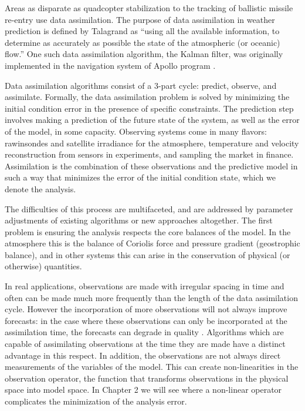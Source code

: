 \documentclass[12pt]{report}
\begin{document}
Areas as disparate as quadcopter stabilization  to the tracking of ballistic missile re-entry  use data assimilation.
The purpose of data assimilation in weather prediction is defined by Talagrand as ``using all the available information, to determine as accurately as possible the state of the atmospheric (or oceanic) flow.'' 
One such data assimilation algorithm, the Kalman filter, was originally implemented in the navigation system of Apollo program .

Data assimilation algorithms consist of a 3-part cycle: predict, observe, and assimilate.
Formally, the data assimilation problem is solved by minimizing the initial condition error in the presence of specific constraints.
The prediction step involves making a prediction of the future state of the system, as well as the error of the model, in some capacity.
Observing systems come in many flavors: rawinsondes and satellite irradiance for the atmosphere, temperature and velocity reconstruction from sensors in experiments, and sampling the market in finance.
Assimilation is the combination of these observations and the predictive model in such a way that minimizes the error of the initial condition state, which we denote the analysis.

The difficulties of this process are multifaceted, and are addressed by parameter adjustments of existing algorithms or new approaches altogether.
The first problem is ensuring the analysis respects the core balances of the model.
In the atmosphere this is the balance of Coriolis force and pressure gradient (geostrophic balance), and in other systems this can arise in the conservation of physical (or otherwise) quantities.

In real applications, observations are made with irregular spacing in time and often can be made much more frequently than the length of the data assimilation cycle.
However the incorporation of more observations will not always improve forecasts: in the case where these observations can only be incorporated at the assimilation time, the forecasts can degrade in quality .
Algorithms which are capable of assimilating observations at the time they are made have a distinct advantage in this respect.
In addition, the observations are not always direct measurements of the variables of the model. 
This can create non-linearities in the observation operator, the function that transforms observations in the physical space into model space.
In Chapter 2 we will see where a non-linear operator complicates the minimization of the analysis error.
\end{document}
